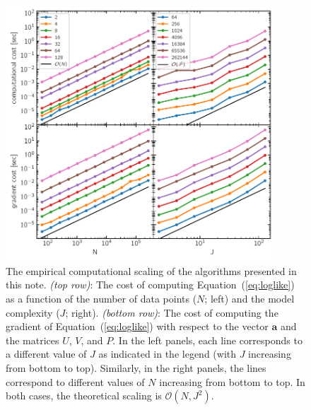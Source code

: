 \documentclass[rnaas]{aastex62}
\newcommand{\figurelabel}[1]{\label{fig:#1}}
\renewcommand{\eqref}[1]{\ref{eq:#1}}
\newcommand{\Eq}[1]{Equation~(\eqref{#1})}
\newcommand{\eq}[1]{\Eq{#1}}
\newcommand{\bvec}[1]{{\ensuremath{\boldsymbol{#1}}}}
\begin{document}
\begin{figure}[htbp]
\begin{center}
\includegraphics[width=0.9\textwidth]{figure.pdf}
\caption{%
    The empirical computational scaling of the algorithms presented in this
    note.
    \emph{(top row)}: The cost of computing \eq{loglike} as a
    function of the number of data points ($N$; left) and the model complexity
    ($J$; right).
    \emph{(bottom row)}: The cost of computing the gradient of \eq{loglike}
    with respect to the vector $\bvec{a}$ and the matrices $U$, $V$, and $P$.
    In the left panels, each line corresponds to a different value of $J$ as
    indicated in the legend (with $J$ increasing from bottom to top).
    Similarly, in the right panels, the lines correspond to different values
    of $N$ increasing from bottom to top.
    In both cases, the theoretical scaling is $\mathcal{O}(N,J^2)$.
\figurelabel{figure}}
\end{center}
\end{figure}



\end{document}
